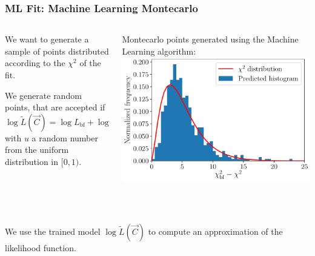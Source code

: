 \documentclass[mathserif, 10pt, dvipsnames]{beamer}
\begin{document}
\begin{frame}\frametitle{ML Fit: Machine Learning Montecarlo}
    \begin{columns}
        \begin{column}{0.5\textwidth}
            We want to generate a sample of points distributed according to the $\chi^2$ of the fit.

            We generate random points, that are accepted if
            $$\log \tilde{L}(\vec{C}) = \log L_\mathrm{bf} + \log u\,,$$
            with $u$ a random number from the uniform distribution in $[0,1)$. %
        \end{column}
        \begin{column}{0.5\textwidth}
{\small Montecarlo points generated using the
Machine Learning algorithm:}\\[0.2em]
            \includegraphics[width=\columnwidth]{figures/hist_xgb.pdf}
        \end{column}
    \end{columns}

    ~

We use the trained model $\log\tilde{L}(\vec{C})$ to compute an approximation of the likelihood function.

\end{frame}
\end{document}
